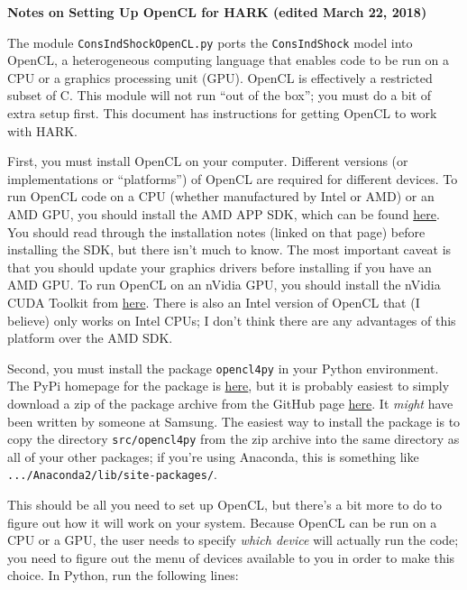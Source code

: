 \documentclass[12pt,pdftex,letterpaper]{article}
\begin{document}
\begin{center}
\textbf{Notes on Setting Up OpenCL for HARK (edited March 22, 2018)}
\end{center}

The module \texttt{ConsIndShockOpenCL.py} ports the \texttt{ConsIndShock} model into OpenCL, a heterogeneous computing language that enables code to be run on a CPU or a graphics processing unit (GPU).  OpenCL is effectively a restricted subset of C.  This module will not run ``out of the box''; you must do a bit of extra setup first.  This document has instructions for getting OpenCL to work with HARK.

First, you must install OpenCL on your computer.  Different versions (or implementations or ``platforms'') of OpenCL are required for different devices.  To run OpenCL code on a CPU (whether manufactured by Intel or AMD) or an AMD GPU, you should install the AMD APP SDK, which can be found \href{https://developer.amd.com/amd-accelerated-parallel-processing-app-sdk/}{here}.  You should read through the installation notes (linked on that page) before installing the SDK, but there isn't much to know.  The most important caveat is that you should update your graphics drivers before installing if you have an AMD GPU.  To run OpenCL on an nVidia GPU, you should install the nVidia CUDA Toolkit from \href{https://developer.nvidia.com/cuda-downloads}{here}.  There is also an Intel version of OpenCL that (I believe) only works on Intel CPUs; I don't think there are any advantages of this platform over the AMD SDK.

Second, you must install the package \texttt{opencl4py} in your Python environment.  The PyPi homepage for the package is \href{https://pypi.python.org/pypi/opencl4py/1.0.1}{here}, but it is probably easiest to simply download a zip of the package archive from the GitHub page \href{https://github.com/ajkxyz/opencl4py}{here}. It \textit{might} have been written by someone at Samsung.  The easiest way to install the package is to copy the directory \texttt{src/opencl4py} from the zip archive into the same directory as all of your other packages; if you're using Anaconda, this is something like \texttt{.../Anaconda2/lib/site-packages/}.

This should be all you need to set up OpenCL, but there's a bit more to do to figure out how it will work on your system.  Because OpenCL can be run on a CPU or a GPU, the user needs to specify \textit{which device} will actually run the code; you need to figure out the menu of devices available to you in order to make this choice.  In Python, run the following lines:
\end{document}
